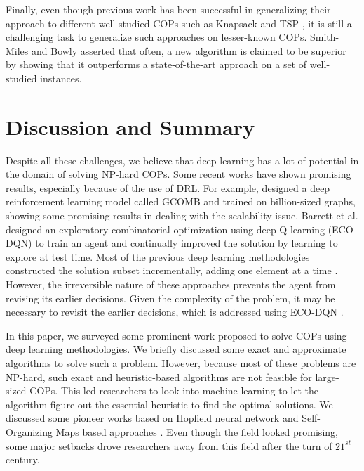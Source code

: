 \documentclass{article}
\begin{document}
Finally, even though previous work has been successful in generalizing their approach to different well-studied COPs such as Knapsack and TSP \cite{bello2016neural}, it is still a challenging task to generalize such approaches on lesser-known COPs. Smith-Miles and Bowly \cite{smith2015generating} asserted that often, a new algorithm is claimed to be superior by showing that it outperforms a state-of-the-art approach on a set of well-studied instances.  


\section{Discussion and Summary}
Despite all these challenges, we believe that deep learning has a lot of potential in the domain of solving NP-hard COPs. Some recent works have shown promising results, especially because of the use of DRL. For example, \cite{mittal2019learning} designed a deep reinforcement learning model called GCOMB and trained on billion-sized graphs, showing some promising results in dealing with the scalability issue. Barrett et al. \cite{barrett2019exploratory} designed an exploratory combinatorial optimization using deep Q-learning (ECO-DQN) to train an agent and continually improved the solution by learning to explore at test time. Most of the previous deep learning methodologies constructed the solution subset incrementally, adding one element at a time \cite{khalil2017learning, li2018combinatorial}. However, the irreversible nature of these approaches prevents the agent from revising its earlier decisions. Given the complexity of the problem, it may be necessary to revisit the earlier decisions, which is addressed using ECO-DQN \cite{barrett2019exploratory}.


In this paper, we surveyed some prominent work proposed to solve COPs using deep learning methodologies. We briefly discussed some exact and approximate algorithms to solve such a problem. However, because most of these problems are NP-hard, such exact and heuristic-based algorithms are not feasible for large-sized COPs. This led researchers to look into machine learning to let the algorithm figure out the essential heuristic to find the optimal solutions. We discussed some pioneer works based on Hopfield neural network \cite{hopfield1985neural} and Self-Organizing Maps based approaches \cite{kohonen1982self}. Even though the field looked promising, some major setbacks drove researchers away from this field after the turn of $21^{st}$ century. 
\end{document}
